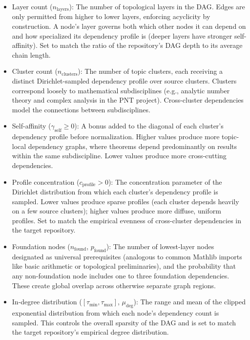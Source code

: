 \begin{itemize}
    \item Layer count ($n_{\mathrm{layers}}$): The number of topological layers in the DAG. Edges are only permitted from higher to lower layers, enforcing acyclicity by construction. A node's layer governs both which other nodes it can depend on and how specialized its dependency profile is (deeper layers have stronger self-affinity). Set to match the ratio of the repository's DAG depth to its average chain length.
 
    \item Cluster count ($n_{\mathrm{clusters}}$): The number of topic clusters, each receiving a distinct Dirichlet-sampled dependency profile over source clusters. Clusters correspond loosely to mathematical subdisciplines (e.g., analytic number theory and complex analysis in the PNT project). Cross-cluster dependencies model the connections between subdisciplines.
 
    \item Self-affinity ($\gamma_{\mathrm{self}} \ge 0$): A bonus added to the diagonal of each cluster's dependency profile before normalization. Higher values produce more topic-local dependency graphs, where theorems depend predominantly on results within the same subdiscipline. Lower values produce more cross-cutting dependencies.
 
    \item Profile concentration ($c_{\mathrm{profile}} > 0$): The concentration parameter of the Dirichlet distribution from which each cluster's dependency profile is sampled. Lower values produce sparse profiles (each cluster depends heavily on a few source clusters); higher values produce more diffuse, uniform profiles. Set to match the empirical evenness of cross-cluster dependencies in the target repository.
 
    \item Foundation nodes ($n_{\mathrm{found}}$, $p_{\mathrm{found}}$): The number of lowest-layer nodes designated as universal prerequisites (analogous to common Mathlib imports like basic arithmetic or topological preliminaries), and the probability that any non-foundation node includes one to three foundation dependencies. These create global overlap across otherwise separate graph regions.
 
    \item In-degree distribution ($[\tau_{\min}, \tau_{\max}]$, $\mu_{\mathrm{deg}}$): The range and mean of the clipped exponential distribution from which each node's dependency count is sampled. This controls the overall sparsity of the DAG and is set to match the target repository's empirical degree distribution.
\end{itemize}
 

